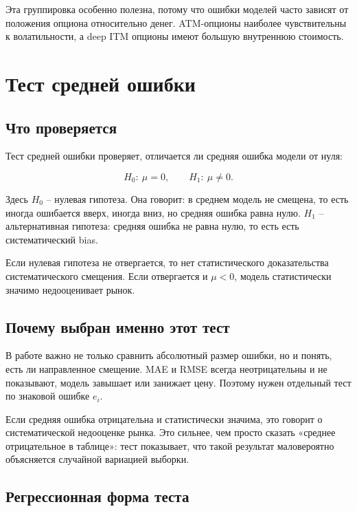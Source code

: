 \documentclass[11pt,a4paper]{article}
\begin{document}
Эта группировка особенно полезна, потому что ошибки моделей часто зависят от положения опциона относительно денег. ATM-опционы наиболее чувствительны к волатильности, а deep ITM опционы имеют большую внутреннюю стоимость.

\section{Тест средней ошибки}

\subsection{Что проверяется}

Тест средней ошибки проверяет, отличается ли средняя ошибка модели от нуля:

\begin{equation}
H_0:\ \mu=0,
\qquad
H_1:\ \mu\neq 0.
\end{equation}

Здесь $H_0$ -- нулевая гипотеза. Она говорит: в среднем модель не смещена, то есть иногда ошибается вверх, иногда вниз, но средняя ошибка равна нулю. $H_1$ -- альтернативная гипотеза: средняя ошибка не равна нулю, то есть есть систематический bias.

Если нулевая гипотеза не отвергается, то нет статистического доказательства систематического смещения. Если отвергается и $\mu<0$, модель статистически значимо недооценивает рынок.

\subsection{Почему выбран именно этот тест}

В работе важно не только сравнить абсолютный размер ошибки, но и понять, есть ли направленное смещение. MAE и RMSE всегда неотрицательны и не показывают, модель завышает или занижает цену. Поэтому нужен отдельный тест по знаковой ошибке $e_i$.

Если средняя ошибка отрицательна и статистически значима, это говорит о систематической недооценке рынка. Это сильнее, чем просто сказать «среднее отрицательное в таблице»: тест показывает, что такой результат маловероятно объясняется случайной вариацией выборки.

\subsection{Регрессионная форма теста}
\end{document}
